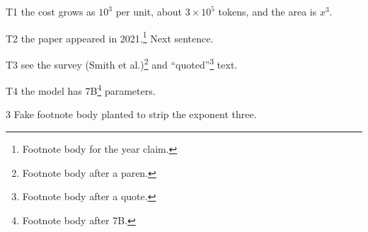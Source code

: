 \documentclass{article}\usepackage[letterpaper,margin=1in]{geometry}\pagestyle{empty}
\begin{document}
T1 the cost grows as $10^{3}$ per unit, about $3 \times 10^{5}$ tokens, and the area is $x^{3}$.

T2 the paper appeared in 2021.\footnote{Footnote body for the year claim.} Next sentence.

T3 see the survey (Smith et al.)\footnote{Footnote body after a paren.} and ``quoted''\footnote{Footnote body after a quote.} text.

T4 the model has 7B\footnote{Footnote body after 7B.} parameters.

\vfill
{\footnotesize 3 Fake footnote body planted to strip the exponent three.}
\end{document}
